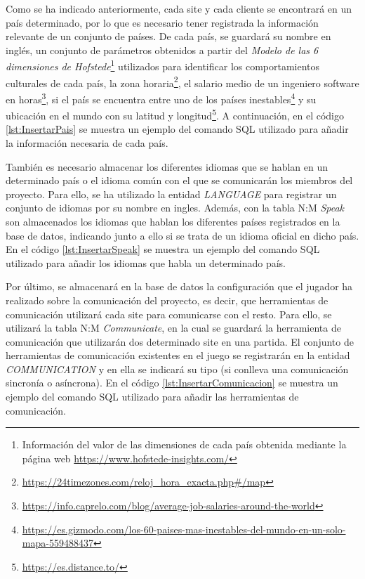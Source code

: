 Como se ha indicado anteriormente, cada site y cada cliente se encontrará en un país determinado, por lo que es necesario tener registrada la información relevante de un conjunto de países. De cada país, se guardará su nombre en inglés, un conjunto de parámetros obtenidos a partir del \emph{Modelo de las 6 dimensiones de Hofstede}\footnote{Información del valor de las dimensiones de cada país obtenida mediante la página web \url{https://www.hofstede-insights.com/}} \cite{hofstede2011dimensionalizing} utilizados para identificar los comportamientos culturales de cada país, la zona horaria\footnote{\url{https://24timezones.com/reloj_hora_exacta.php\#/map}}, el salario medio de un ingeniero software en horas\footnote{\url{https://info.caprelo.com/blog/average-job-salaries-around-the-world}}, si el país se encuentra entre uno de los países inestables\footnote{\url{https://es.gizmodo.com/los-60-paises-mas-inestables-del-mundo-en-un-solo-mapa-559488437}} y su ubicación en el mundo con su latitud y longitud\footnote{\url{https://es.distance.to/}}. A continuación, en el código \ref{lst:InsertarPais} se muestra un ejemplo del comando SQL utilizado para añadir la información necesaria de cada país.



También es necesario almacenar los diferentes idiomas que se hablan en un determinado país o el idioma común con el que se comunicarán los miembros del proyecto. Para ello, se ha utilizado la entidad \emph{LANGUAGE} para registrar un conjunto de idiomas por su nombre en ingles. Además, con la tabla N:M \emph{Speak} son almacenados los idiomas que hablan los diferentes países registrados en la base de datos, indicando junto a ello si se trata de un idioma oficial en dicho país. En el código \ref{lst:InsertarSpeak} se muestra un ejemplo del comando SQL utilizado para añadir los idiomas que habla un determinado país.



Por último, se almacenará en la base de datos la configuración que el jugador ha realizado sobre la comunicación del proyecto, es decir, que herramientas de comunicación utilizará cada site para comunicarse con el resto. Para ello, se utilizará la tabla N:M \emph{Communicate}, en la cual se guardará la herramienta de comunicación que utilizarán dos determinado site en una partida. El conjunto de herramientas de comunicación existentes en el juego se registrarán en la entidad \emph{COMMUNICATION} y en ella se indicará su tipo (si conlleva una comunicación sincronía o asíncrona). En el código \ref{lst:InsertarComunicacion} se muestra un ejemplo del comando SQL utilizado para añadir las herramientas de comunicación.

